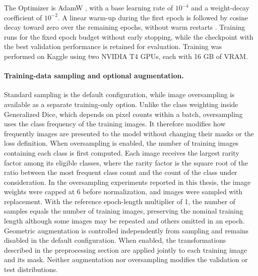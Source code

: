 The Optimizer is AdamW \cite{loshchilov2019adamw}, with a base learning rate of \(10^{-4}\) and a weight-decay coefficient of \(10^{-2}\). A linear warm-up during the first epoch is followed by cosine decay toward zero over the remaining epochs, without warm restarts \cite{loshchilov2017sgdr}. Training runs for the fixed epoch budget without early stopping, while the checkpoint with the best validation performance is retained for evaluation. Training was performed on Kaggle using two NVIDIA T4 GPUs, each with 16 GB of VRAM.

\paragraph{Training-data sampling and optional augmentation.}

Standard sampling is the default configuration, while image oversampling is available as a separate training-only option. Unlike the class weighting inside Generalized Dice, which depends on pixel counts within a batch, oversampling uses the class frequency of the training images. It therefore modifies how frequently images are presented to the model without changing their masks or the loss definition. When oversampling is enabled, the number of training images containing each class is first computed. Each image receives the largest rarity factor among its eligible classes, where the rarity factor is the square root of the ratio between the most frequent class count and the count of the class under consideration. In the oversampling experiments reported in this thesis, the image weights were capped at 6 before normalization, and images were sampled with replacement. With the reference epoch-length multiplier of 1, the number of samples equals the number of training images, preserving the nominal training length although some images may be repeated and others omitted in an epoch.
Geometric augmentation is controlled independently from sampling and remains disabled in the default configuration. When enabled, the transformations described in the preprocessing section are applied jointly to each training image and its mask. Neither augmentation nor oversampling modifies the validation or test distributions.

